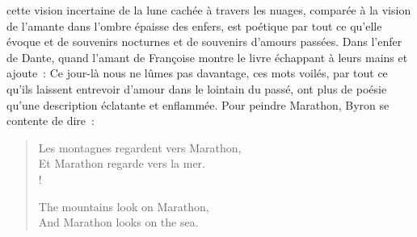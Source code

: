\documentclass[french,twoside]{book} %
\begin{document}
\noindent cette vision incertaine de la lune cachée à travers les nuages, comparée à la vision de l’amante dans l’ombre épaisse des enfers, est poétique par tout ce qu’elle évoque et de souvenirs nocturnes et de souvenirs d’amours passées. Dans l’enfer de Dante, quand l’amant de Françoise montre le livre échappant à leurs mains et ajoute : Ce jour-là nous ne lûmes pas davantage, ces mots voilés, par tout ce qu’ils laissent entrevoir d’amour dans le lointain du passé, ont plus de poésie qu’une description éclatante et enflammée. Pour peindre Marathon, Byron se contente de dire :\par


\begin{verse}
Les montagnes regardent vers Marathon,\\
Et Marathon regarde vers la mer.\\!

The mountains look on Marathon,\\
And Marathon looks on the sea.\\
\end{verse}
\end{document}
